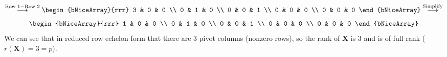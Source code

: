 \begin{enumerate}[label=(\alph*)]
\[        \overset{\text{Row 1} - \text{Row 2}}{\longrightarrow}
        \begin{bNiceArray}{rrr}
            3 & 0 & 0 \\
            0 & 1 & 0 \\
            0 & 0 & 1 \\
            0 & 0 & 0 \\
            0 & 0 & 0
        \end{bNiceArray}
        \overset{\text{Simplify}}{\longrightarrow}
    \]
    \[
        \begin{bNiceArray}{rrr}
            1 & 0 & 0 \\
            0 & 1 & 0 \\
            0 & 0 & 1 \\
            0 & 0 & 0 \\
            0 & 0 & 0
        \end{bNiceArray}
    \]
    We can see that in reduced row echelon form that there are 3 pivot columns (nonzero rows),
    so the rank of $\textbf{X}$ is 3 and is of full rank ($r(\textbf{X}) = 3 = p$).
\end{enumerate}